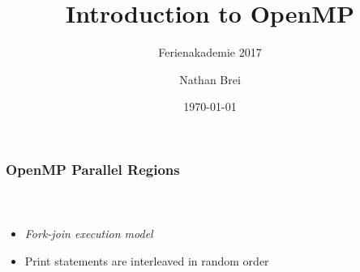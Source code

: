 \documentclass[handout]{beamer}
\title{Introduction to OpenMP}
\subtitle{Ferienakademie 2017}
\author{Nathan Brei}
\institute{}
\date\today
\begin{document}
\begin{frame}
  \titlepage
\end{frame}

\begin{frame}[fragile]
  \frametitle{OpenMP Parallel Regions}
  \begin{columns}[t]%
    \begin{column}{0.65\textwidth}
      \inputminted{c}{src/ex1.c}
    \end{column}
    \pause
    \begin{column}{0.4\textwidth}
      \inputminted{text}{output/ex1.txt}
    \end{column}
  \end{columns}
  \pause
  \begin{itemize}
  \item \emph{Fork-join execution model}
  \item Print statements are interleaved in random order
  \end{itemize}
\end{frame}
\end{document}

